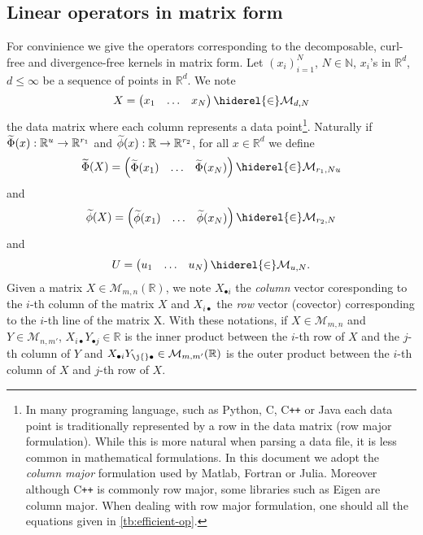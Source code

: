 \subsection{Linear operators in matrix form}
For convinience we give the operators corresponding to the decomposable, curl-free and divergence-free kernels in matrix form. Let $(x_i)_{i=1}^N$, $N\in\mathbb{N}$, $x_i$'s in $\mathbb{R}^d$, $d\le\infty$ be a sequence of points in $\mathbb{R}^d$. We note
\begin{dmath*}
X=\begin{pmatrix}x_1 & \hdots & x_N\end{pmatrix}\hiderel{\in}\mathcal{M}_{d,N}
\end{dmath*}
the data matrix where each column represents a data point\footnote{In many programing language, such as Python, C, C{}\verb!++! or Java each data point is traditionally represented by a row in the data matrix (row major formulation). While this is more natural when parsing a data file, it is less common in mathematical formulations. In this document we adopt the \emph{column major} formulation used by Matlab, Fortran or Julia. Moreover although C{}\verb!++! is commonly row major, some libraries such as Eigen are column major. When dealing with row major formulation, one should  all the equations given in \cref{tb:efficient-op}.}. Naturally if $\widetilde{\Phi}(x):\mathbb{R}^u\to\mathbb{R}^{r_1}$ and $\widetilde{\phi}(x):\mathbb{R}\to\mathbb{R}^{r_2}$, for all $x\in\mathbb{R}^d$ we define
\begin{dmath*}
\tildePhi{\omega}(X)=\begin{pmatrix}\tildePhi{\omega}(x_1) & \hdots & \tildePhi{\omega}(x_N)\end{pmatrix}\hiderel{\in}\mathcal{M}_{r_1,Nu}
\end{dmath*}
and
\begin{dmath*}
\tildephi{\omega}(X)=\begin{pmatrix}\tildephi{\omega}(x_1) & \hdots & \tildephi{\omega}(x_N)\end{pmatrix}\hiderel{\in}\mathcal{M}_{r_2, N}
\end{dmath*}
and
\begin{dmath*}
U=\begin{pmatrix} u_1 & \hdots&  u_N \end{pmatrix}\hiderel{\in}\mathcal{M}_{u, N}.
\end{dmath*}
Given a matrix $X\in\mathcal{M}_{m,n}(\mathbb{R})$, we note $X_{\bullet i}$ the \emph{column} vector coresponding to the $i$-th column of the matrix $X$ and $X_{i \bullet}$ the \emph{row} vector (covector) corresponding to the $i$-th line of the matrix X. With these notations, if $X\in\mathcal{M}_{m,n}$ and $Y\in\mathcal{M}_{n,m'}$, $X_{i\bullet}Y_{\bullet j}\in\mathbb{R}$ is the inner product between the $i$-th row of $X$ and the $j$-th column of $Y$ and $X_{\bullet i} Y_{\j{}  \bullet}\in\mathcal{M}_{m,m'}(\mathbb{R})$ is the outer product between the $i$-th column of $X$ and $j$-th row of $X$.
